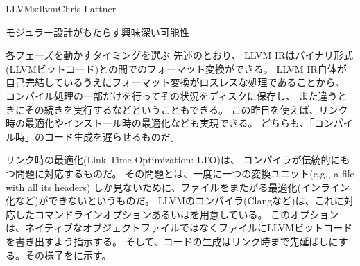 \begin{aosachapter}{LLVM}{s:llvm}{Chris Lattner}
\begin{aosasect1}{モジュラー設計がもたらす興味深い可能性}
\begin{aosasect2}{各フェーズを動かすタイミングを選ぶ}
先述のとおり、
LLVM IRはバイナリ形式(LLVMビットコード)との間でのフォーマット変換ができる。
LLVM IR自体が自己完結しているうえにフォーマット変換がロスレスな処理であることから、
コンパイル処理の一部だけを行ってその状況をディスクに保存し、
また違うときにその続きを実行するなどということもできる。
この昨日を使えば、リンク時の最適化やインストール時の最適化なども実現できる。
どちらも、「コンパイル時」のコード生成を遅らせるものだ。

リンク時の最適化(Link-Time Optimization: LTO)は、
コンパイラが伝統的にもつ問題に対応するものだ。
その問題とは、一度に一つの変換ユニット(e.g., a  file with all its headers)
しか見ないために、ファイルをまたがる最適化(インライン化など)ができないというものだ。
LLVMのコンパイラ(Clangなど)は、これに対応したコマンドラインオプションあるいはを用意している。
このオプションは、ネイティブなオブジェクトファイルではなくファイルにLLVMビットコードを書き出すよう指示する。
そして、コードの生成はリンク時まで先延ばしにする。その様子をに示す。



\end{aosasect2}
\end{aosasect1}
\end{aosachapter}

